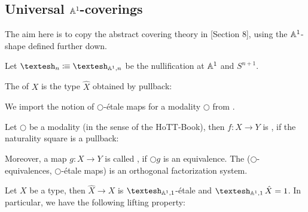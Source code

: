 \subsection{Universal $\mathbb{A}^1$-coverings}

The aim here is to copy the abstract covering theory in \cite{cherubini_rijke_2021}[Section 8],
using the $\mathbb{A}^1$-shape defined further down.

\begin{definition}
  Let $\shape_n\colonequiv\shape_{\A^1,n}$ be the nullification at $\mathbb{A}^1$ and $S^{n+1}$.
\end{definition}

\begin{definition}
  The  of $X$ is the type $\hat{X}$ obtained by pullback:
  \begin{center}
  \end{center}
\end{definition}

We import the notion of $\bigcirc$-étale maps for a modality $\bigcirc$ from \cite{cherubini_rijke_2021}.

\begin{definition}
  Let $\bigcirc$ be a modality (in the sense of the HoTT-Book),
  then $f:X\to Y$ is , if the naturality square is a pullback:
  \begin{center}
  \end{center}
  Moreover, a map $g:X\to Y$ is called ,
  if $\bigcirc g$ is an equivalence.
  The ($\bigcirc$-equivalences, $\bigcirc$-étale maps) is an orthogonal factorization system. 
\end{definition}

\begin{proposition}
  Let $X$ be a type, then $\hat{X}\to X$ is $\shape_{\A^1,1}$-étale and $\shape_{\A^1,1}\hat{X}=1$.
  In particular, we have the following lifting property:
  \begin{center}
  \end{center}
\end{proposition}

